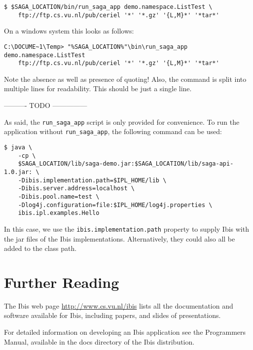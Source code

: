 \documentclass[a4paper,10pt]{article}
\begin{document}
\noindent
{\small
\begin{verbatim}
$ $SAGA_LOCATION/bin/run_saga_app demo.namespace.ListTest \
    ftp://ftp.cs.vu.nl/pub/ceriel '*' '*.gz' '{L,M}*' '*tar*'
\end{verbatim}
}
\noindent

On a windows system this looks as follows:

\noindent
{\small
\begin{verbatim}
C:\DOCUME~1\Temp> "%SAGA_LOCATION%"\bin\run_saga_app demo.namespace.ListTest
    ftp://ftp.cs.vu.nl/pub/ceriel '*' '*.gz' '{L,M}*' '*tar*'
\end{verbatim}
}
\noindent

Note the absence as well as presence of quoting! Also, the
command is split into multiple lines for readability.
This should be just a single line.

---------- TODO ---------------

As said, the \texttt{run\_saga\_app} script is only provided for convenience.
To run the application without \texttt{run\_saga\_app}, the following command
can be used:

\noindent
{\small
\begin{verbatim}
$ java \
    -cp \
    $SAGA_LOCATION/lib/saga-demo.jar:$SAGA_LOCATION/lib/saga-api-1.0.jar: \
    -Dibis.implementation.path=$IPL_HOME/lib \
    -Dibis.server.address=localhost \
    -Dibis.pool.name=test \
    -Dlog4j.configuration=file:$IPL_HOME/log4j.properties \
    ibis.ipl.examples.Hello
\end{verbatim}
}
\noindent

In this case, we use the \texttt{ibis.implementation.path} property to supply Ibis
with the jar files of the Ibis implementations. Alternatively, they
could also all be added to the class path.


\section{Further Reading}

The Ibis web page \url{http://www.cs.vu.nl/ibis} lists all
the documentation and software available for Ibis, including papers, and
slides of presentations.

For detailed information on developing an Ibis application see the
Programmers Manual, available in the docs directory of the Ibis
distribution.
\end{document}
